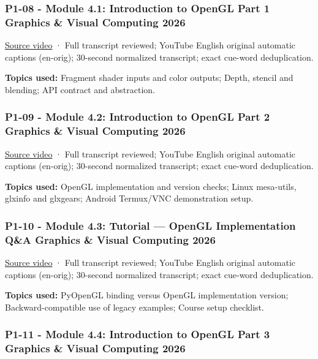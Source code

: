 \subsubsection{P1-08 - Module 4.1: Introduction to OpenGL Part 1 Graphics \& Visual Computing 2026}\label{04-visual-computing-ii-ch036-p1-08---module-4.1-introduction-to-opengl-part-1-graphics-visual-computing-2026}

\href{https://www.youtube.com/watch?v=I1VFptM0obM}{Source video} · Full transcript reviewed; YouTube English original automatic captions (en-orig); 30-second normalized transcript; exact cue-word deduplication.

\textbf{Topics used:} Fragment shader inputs and color outputs; Depth, stencil and blending; API contract and abstraction.

\subsubsection{P1-09 - Module 4.2: Introduction to OpenGL Part 2 Graphics \& Visual Computing 2026}\label{04-visual-computing-ii-ch036-p1-09---module-4.2-introduction-to-opengl-part-2-graphics-visual-computing-2026}

\href{https://www.youtube.com/watch?v=CpN9JORFZ7s}{Source video} · Full transcript reviewed; YouTube English original automatic captions (en-orig); 30-second normalized transcript; exact cue-word deduplication.

\textbf{Topics used:} OpenGL implementation and version checks; Linux mesa-utils, glxinfo and glxgears; Android Termux/VNC demonstration setup.

\subsubsection{P1-10 - Module 4.3: Tutorial --- OpenGL Implementation Q\&A Graphics \& Visual Computing 2026}\label{04-visual-computing-ii-ch036-p1-10---module-4.3-tutorial-opengl-implementation-qa-graphics-visual-computing-2026}

\href{https://www.youtube.com/watch?v=Mt8QU6JWY20}{Source video} · Full transcript reviewed; YouTube English original automatic captions (en-orig); 30-second normalized transcript; exact cue-word deduplication.

\textbf{Topics used:} PyOpenGL binding versus OpenGL implementation version; Backward-compatible use of legacy examples; Course setup checklist.

\subsubsection{P1-11 - Module 4.4: Introduction to OpenGL Part 3 Graphics \& Visual Computing 2026}\label{04-visual-computing-ii-ch036-p1-11---module-4.4-introduction-to-opengl-part-3-graphics-visual-computing-2026}


